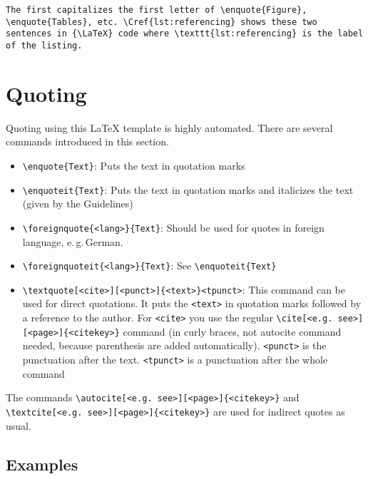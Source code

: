 \begin{lstlisting}[language={[LaTeX]TeX},label={lst:referencing},caption={How to reference.}]
The first capitalizes the first letter of \enquote{Figure}, \enquote{Tables}, etc. \Cref{lst:referencing} shows these two sentences in {\LaTeX} code where \texttt{lst:referencing} is the label of the listing.
\end{lstlisting}

\section{Quoting}
\label{sec:Quoting}

Quoting using this {\LaTeX} template is highly automated. There are several commands introduced in this section.

\begin{itemize}
	\item \lstinline[language={[LaTeX]TeX}]!\enquote{Text}!: Puts the text in quotation marks
	\item \lstinline[language={[LaTeX]TeX}]!\enquoteit{Text}!: Puts the text in quotation marks and italicizes the text (given by the Guidelines)
	\item \lstinline[language={[LaTeX]TeX}]!\foreignquote{<lang>}{Text}!: Should be used for quotes in foreign language, e.\,g.\,German.
	\item \lstinline[language={[LaTeX]TeX}]!\foreignquoteit{<lang>}{Text}!: See \lstinline[language={[LaTeX]TeX}]!\enquoteit{Text}!
	\item \lstinline[language={[LaTeX]TeX}]!\textquote[<cite>][<punct>]{<text>}<tpunct>!: This command can be used for direct quotations. It puts the \texttt{<text>} in quotation marks followed by a reference to the author. For \texttt{<cite>} you use the regular \lstinline[language={[LaTeX]TeX}]!\cite[<e.g. see>][<page>]{<citekey>}! command (in curly braces, not autocite command needed, because parenthesis are added automatically). \texttt{<punct>} is the punctuation after the text. \texttt{<tpunct>} is a punctuation after the whole command
\end{itemize}

The commands \lstinline[language={[LaTeX]TeX}]!\autocite[<e.g. see>][<page>]{<citekey>}! and \lstinline[language={[LaTeX]TeX}]!\textcite[<e.g. see>][<page>]{<citekey>}! are used for indirect quotes as usual.

\subsection{Examples}
\label{sec:QuotingExamples}

